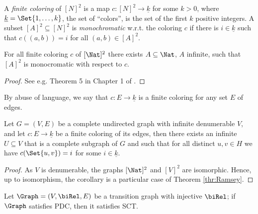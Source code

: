 A {\em finite coloring} of $[N]^2$ is a map  
$c:[N]^2 \to \underline{k}$ for some $k > 0$, where $\underline{k} = \Set{1, \ldots , k}$, the set of ``colors'', is the set of the first $k$ positive integers.
A subset $[A]^2 \subseteq [N]^2$ is {\em monochromatic} w.r.t. the coloring $c$ if there is $i \in \underline{k}$ such that  $c((a,b)) = i$ for all
$(a,b) \in [A]^2$.

\begin{theorem}\label{thr:Ramsey}
For all finite coloring $c$ of $[\Nat]^2$ there exists $A \subseteq \Nat$, $A$ infinite, such that $[A]^2$ is monocromatic with respect to $c$.
\end{theorem}

\begin{proof} See e.g. Theorem 5 in Chapter 1 of \cite{Graham1980}.
\end{proof}

By abuse of language, we say that $c:E \to \underline{k}$ is a finite coloring for any set $E$ of edges.

\begin{corollary}\label{cor:Ramsey}
Let $G = (V, E)$ be a complete undirected graph with infinite denumerable $V$, and let $c: E \to \underline{k}$ be a finite coloring of its edges,
then there exists an infinite $U \subseteq V$ that is a complete subgraph of $G$ and such that for all distinct $u, v \in H$ we have $c(\Set{u,v}) = i$ for some $i \in \underline{k}$.
\end{corollary}

\begin{proof}
As $V$ is denumerable, the graphs $[\Nat]^2$ and $[V]^2$ are isomorphic.
Hence,  up to isomorphism, the corollary is a particular case of Theorem \ref{thr:Ramsey}.
\end{proof}


\begin{theorem}\label{thr:PDC+injImpliesGTC}
Let $\Graph = (V, \biRel, E)$ be a transition graph with injective $\biRel$; if $\Graph$ satisfies PDC, then it satisfies SCT.
\end{theorem}

